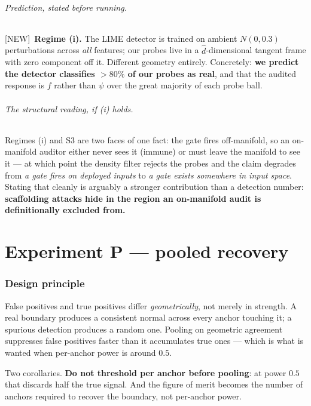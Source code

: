 \documentclass[11pt]{article}
\newcommand{\provtag}[2]{{\footnotesize\sffamily\textcolor{#1}{[#2]}}}
\newcommand{\NEWT}{\provtag{newmag}{NEW}}
\begin{document}
\paragraph{Prediction, stated before running.} \NEWT\ \textbf{Regime (i).} The LIME detector is
trained on ambient $N(0, 0.3)$ perturbations across \emph{all} features; our probes live in a
$\hat d$-dimensional tangent frame with zero component off it. Different geometry entirely.
Concretely: \textbf{we predict the detector classifies $> 80\%$ of our probes as real}, and that
the audited response is $f$ rather than $\psi$ over the great majority of each probe ball.

\paragraph{The structural reading, if (i) holds.} Regimes (i) and S3 are two faces of one fact:
the gate fires off-manifold, so an on-manifold auditor either never sees it (immune) or must
leave the manifold to see it --- at which point the density filter rejects the probes and the
claim degrades from \emph{a gate fires on deployed inputs} to \emph{a gate exists somewhere in
input space}. Stating that cleanly is arguably a stronger contribution than a detection number:
\textbf{scaffolding attacks hide in the region an on-manifold audit is definitionally excluded
from.}

\part{Experiment P --- pooled recovery}

\section{Design principle}

\begin{claimbox}
\noindent False positives and true positives differ \emph{geometrically}, not merely in
strength. A real boundary produces a consistent normal across every anchor touching it; a
spurious detection produces a random one. Pooling on geometric agreement suppresses false
positives faster than it accumulates true ones --- which is what is wanted when per-anchor power
is around $0.5$.
\end{claimbox}

\noindent Two corollaries. \textbf{Do not threshold per anchor before pooling}: at power $0.5$
that discards half the true signal. And the figure of merit becomes the number of anchors
required to recover the boundary, not per-anchor power.
\end{document}
